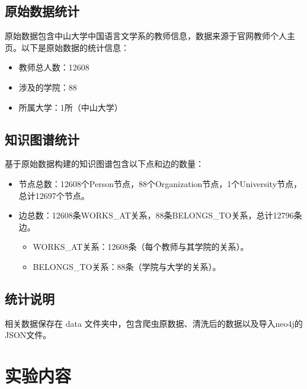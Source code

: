 \subsection{原始数据统计}
原始数据包含中山大学中国语言文学系的教师信息，数据来源于官网教师个人主页。以下是原始数据的统计信息：
\begin{itemize}
    \item 教师总人数：12608
    \item 涉及的学院：88
    \item 所属大学：1所（中山大学）
\end{itemize}

\subsection{知识图谱统计}
基于原始数据构建的知识图谱包含以下点和边的数量：
\begin{itemize}
    \item 节点总数：12608个Person节点，88个Organization节点，1个University节点，总计12697个节点。
    \item 边总数：12608条WORKS\_AT关系，88条BELONGS\_TO关系，总计12796条边。
    \begin{itemize}
        \item WORKS\_AT关系：12608条（每个教师与其学院的关系）。
        \item BELONGS\_TO关系：88条（学院与大学的关系）。
    \end{itemize}
\end{itemize}

\subsection{统计说明}

相关数据保存在 data 文件夹中，包含爬虫原数据、清洗后的数据以及导入neo4j的JSON文件。

\section{实验内容}
